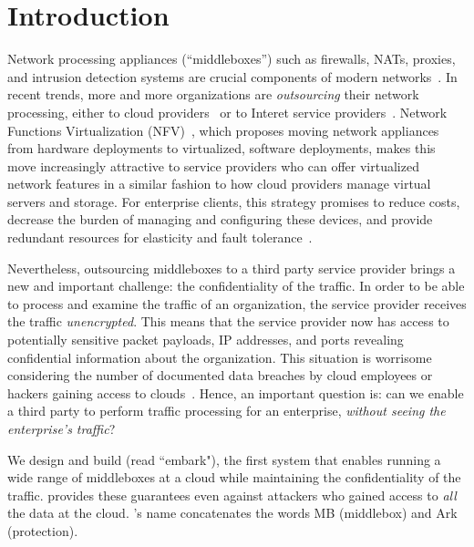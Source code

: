 

\section{Introduction}\label{sec:intro}


    Network processing appliances (``middleboxes'') such as firewalls, NATs, proxies, and intrusion detection systems are crucial components of modern networks~\cite{aplomb,darksideofthemiddle,morley-paper}. 
     In recent trends, more and more organizations are {\it outsourcing} their network processing, either to cloud providers~\cite{aplomb, aryaka, zscalar} or to Interet service providers~\cite{attddos,comcastparentalfiltering}. 
     Network Functions Virtualization (NFV)~\cite{nfv}, which proposes moving network appliances from hardware deployments to virtualized, software deployments, makes this move increasingly attractive to service providers who can offer virtualized network features in a similar fashion to how cloud providers manage virtual servers and storage.
     For enterprise clients, this strategy promises to reduce costs, decrease the burden of managing and configuring these devices, and provide redundant resources for elasticity and fault tolerance~\cite{aplomb}.
   
   Nevertheless, outsourcing middleboxes to a third party service provider brings a new and important challenge: the confidentiality of the traffic. In order to be able to process and examine the traffic of an organization, the service provider  receives  the traffic {\em unencrypted}.  This means that the service provider now has access to potentially sensitive packet payloads,  IP addresses, and ports revealing confidential information about the organization. This situation is worrisome considering the number of documented data breaches by cloud employees or hackers gaining access to clouds~\cite{PrivacyRecords}.
   Hence, an important question is: can we enable a third party to perform traffic processing for an enterprise, {\em without seeing the enterprise's traffic}?
   
   
    We design and build \sys (read ``embark"), the first system that enables running a wide range of middleboxes at a cloud  while maintaining the confidentiality of the traffic. \sys provides these guarantees even against attackers who gained access to {\em all} the data at the cloud.  \sys's name concatenates the words MB (middlebox) and Ark (protection). 
    

